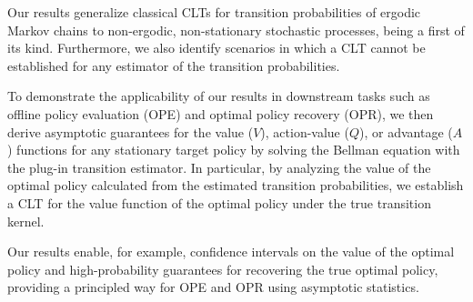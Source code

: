 \documentclass[twoside,11pt]{article}
\numberwithin{equation}{section}
\begin{document}
Our results generalize classical CLTs for transition probabilities of ergodic Markov chains \citep{billingsley1961statistical} to non-ergodic, non-stationary stochastic processes, being a first of its kind. Furthermore, we also identify scenarios in which a CLT cannot be established for any estimator of the transition probabilities. 

To demonstrate the applicability of our results in downstream tasks such as offline policy evaluation (OPE) and optimal policy recovery (OPR), we then derive asymptotic guarantees for the value ($V$), action-value ($Q$), or advantage ($A$) functions for any stationary target policy by solving the Bellman equation with the plug-in transition estimator.
In particular, by analyzing the value of the optimal policy calculated from the estimated transition probabilities, we establish a CLT for the value function of the optimal policy under the true transition kernel. 

Our results enable, for example, confidence intervals on the value of the optimal policy and high-probability guarantees for recovering the true optimal policy, providing a principled way for OPE and OPR using asymptotic statistics. 
\end{document}

